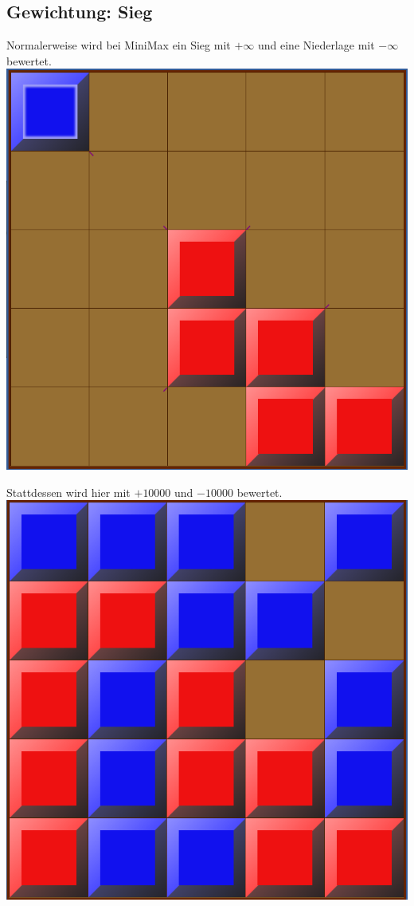 \documentclass[12pt, draft]{beamer}
\begin{document}
\subsection{Gewichtung: Sieg}
\begin{frame}
Normalerweise wird bei MiniMax ein Sieg mit $+\infty$ und eine Niederlage mit $-\infty$ bewertet.
\pause
\includegraphics[width=0.6\linewidth]{media/wgh22.png}
\end{frame}
\begin{frame}
Stattdessen wird hier mit $+10000$ und $-10000$ bewertet.
\pause
\includegraphics[width=0.6\linewidth]{media/wgh23.png}
\end{frame}
\end{document}
